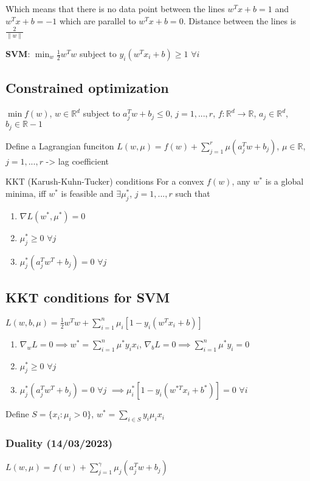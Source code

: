 \documentclass[11pt]{article}
\begin{document}
Which means that there is no data point between the lines \(w^Tx + b = 1\) and \(w^Tx + b = -1\) which are parallel to \(w^Tx + b = 0\).
Distance between the lines is \(\frac{2}{\lVert w \rVert}\)

\textbf{SVM}: \(\min_w \frac{1}{2} w^Tw\) subject to \(y_i(w^Tx_i + b) \geq 1\) \(\forall i\)

\subsection{Constrained optimization}
\label{sec:org44eaf93}
\(\min f(w)\), \(w \in \mathbb{R}^d\) subject to \(a_j^Tw + b_j \leq 0\),
\(j = 1, ..., r\), \(f: \mathbb{R}^d \rightarrow \mathbb{R}\), \(a_j \in \mathbb{R}^d\), \(b_j \in \mathbb{R}-1\)

Define a Lagrangian funciton
\(L(w, \mu) = f(w) + \sum_{j=1}^r \mu (a_j^Tw + b_j)\), \(\mu \in \mathbb{R}\), \(j = 1, ..., r\) -> lag coefficient

KKT (Karush-Kuhn-Tucker) conditions
For a convex \(f(w)\), any \(w^{*}\) is a global minima, iff \(w^{*}\) is feasible and \(\exists \mu_j^{*}\), \(j=1, ..., r\) such that
\begin{enumerate}
\item \(\nabla L(w^{*}, \mu^{*}) = 0\)
\item \(\mu_j^{*} \geq 0\) \(\forall j\)
\item \(\mu_j^{*} (a_j^Tw^T + b_j) = 0\) \(\forall j\)
\end{enumerate}

\subsection{KKT conditions for SVM}
\label{sec:org362081e}
\(L(w, b, \mu) = \frac{1}{2} w^Tw + \sum_{i=1}^n \mu_i \left[ 1 - y_i(w^Tx_i + b) \right]\)
\begin{enumerate}
\item \(\nabla_w L = 0 \implies w^{*} = \sum_{i=1}^n \mu^{*}y_ix_i\), \(\nabla_b L = 0 \implies \sum_{i=1}^n \mu^{*}y_i = 0\)
\item \(\mu_j^{*} \geq 0\) \(\forall j\)
\item \(\mu_j^{*} (a_j^Tw^T + b_j) = 0\) \(\forall j\) \(\implies \mu_i^{*} \left[ 1 - y_i(w^{*T}x_i + b^{*}) \right] = 0\) \(\forall i\)
\end{enumerate}

Define \(S = \{x_i: \mu_i > 0\}\), \(w^{*} = \sum_{i \in S} y_i\mu_ix_i\)

\subsubsection{Duality (14/03/2023)}
\label{sec:orga3c8a92}
\(L(w, \mu) = f(w) + \sum_{j=1}^{\gamma} \mu_j (a_j^T w + b_j)\)
\end{document}
